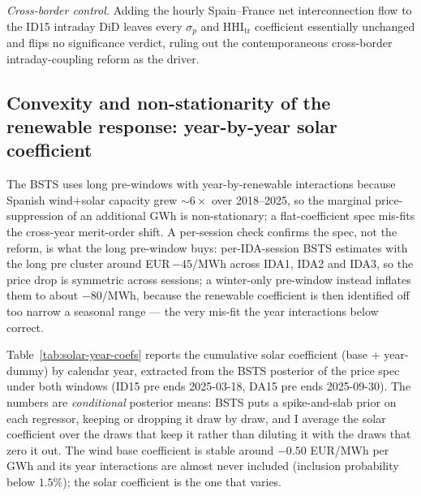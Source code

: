 \documentclass[11pt,a4paper]{article}
\theoremstyle{definition}
\theoremstyle{remark}
\theoremstyle{plain}
\begin{document}
\emph{Cross-border control.} Adding the hourly Spain--France net interconnection flow to the ID15 intraday DiD leaves every $\sigma_p$ and $\text{HHI}_{\text{tr}}$ coefficient essentially unchanged and flips no significance verdict, ruling out the contemporaneous cross-border intraday-coupling reform as the driver.

\subsection{Convexity and non-stationarity of the renewable response: year-by-year solar coefficient}\label{app:solar-year-coefs}

The BSTS uses long pre-windows with year-by-renewable interactions because Spanish wind$+$solar capacity grew ${\sim}6\times$ over 2018--2025, so the marginal price-suppression of an additional GWh is non-stationary; a flat-coefficient spec mis-fits the cross-year merit-order shift. A per-session check confirms the spec, not the reform, is what the long pre-window buys: per-IDA-session BSTS estimates with the long pre cluster around EUR\,$-45$/MWh across IDA1, IDA2 and IDA3, so the price drop is symmetric across sessions; a winter-only pre-window instead inflates them to about $-80$/MWh, because the renewable coefficient is then identified off too narrow a seasonal range --- the very mis-fit the year interactions below correct.

Table~\ref{tab:solar-year-coefs} reports the cumulative solar coefficient (base + year-dummy) by calendar year, extracted from the BSTS posterior of the price spec under both windows (ID15 pre ends 2025-03-18, DA15 pre ends 2025-09-30). The numbers are \emph{conditional} posterior means: BSTS puts a spike-and-slab prior on each regressor, keeping or dropping it draw by draw, and I average the solar coefficient over the draws that keep it rather than diluting it with the draws that zero it out. The wind base coefficient is stable around $-0.50$ EUR/MWh per GWh and its year interactions are almost never included (inclusion probability below $1.5\%$); the solar coefficient is the one that varies.
\end{document}
